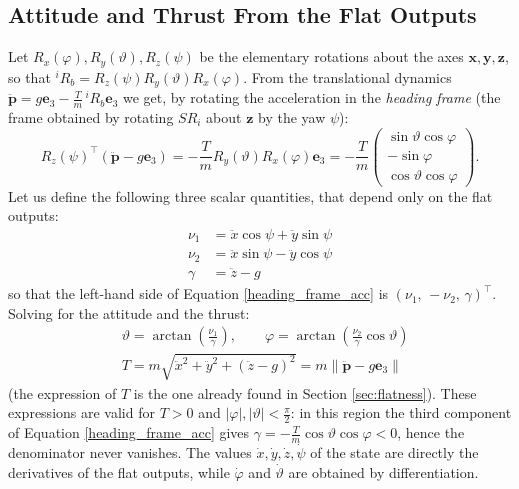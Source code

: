 \documentclass[10pt, a4paper]{report}
\begin{document}
\subsection{Attitude and Thrust From the Flat Outputs}
Let $R_x(\varphi),R_y(\vartheta),R_z(\psi)$ be the elementary rotations about the axes $\mathbf x,\mathbf y,\mathbf z$, so that ${}^iR_b=R_z(\psi)R_y(\vartheta)R_x(\varphi)$. From the translational dynamics $\ddot{\mathbf p}=g\mathbf e_3-\frac{T}{m}\,{}^iR_b\mathbf e_3$ we get, by rotating the acceleration in the \textit{heading frame} (the frame obtained by rotating $SR_i$ about $\mathbf z$ by the yaw $\psi$):\begin{equation}\label{heading_frame_acc}
    R_z(\psi)^\top\left(\ddot{\mathbf p}-g\mathbf e_3\right)=-\frac{T}{m}R_y(\vartheta)R_x(\varphi)\mathbf e_3=-\frac{T}{m}\begin{pmatrix}
        \sin\vartheta\cos\varphi\\-\sin\varphi\\\cos\vartheta\cos\varphi
    \end{pmatrix}.
\end{equation}
Let us define the following three scalar quantities, that depend only on the flat outputs:\begin{align}
    \nu_1&=\ddot x\cos\psi+\ddot y\sin\psi\\
    \nu_2&=\ddot x\sin\psi-\ddot y\cos\psi\\
    \gamma&=\ddot z-g
\end{align}
so that the left-hand side of Equation \eqref{heading_frame_acc} is $(\nu_1,\,-\nu_2,\,\gamma)^\top$. Solving for the attitude and the thrust:\begin{align}
    &\vartheta=\arctan\left(\frac{\nu_1}{\gamma}\right),\quad\quad\varphi=\arctan\left(\frac{\nu_2}{\gamma}\cos\vartheta\right)\label{angles_from_flat}\\
    &T=m\sqrt{\ddot x^2+\ddot y^2+(\ddot z-g)^2}=m\|\ddot{\mathbf p}-g\mathbf e_3\|
\end{align}
(the expression of $T$ is the one already found in Section \ref{sec:flatness}). These expressions are valid for $T>0$ and $|\varphi|,|\vartheta|<\frac{\pi}{2}$: in this region the third component of Equation \eqref{heading_frame_acc} gives $\gamma=-\frac{T}{m}\cos\vartheta\cos\varphi<0$, hence the denominator never vanishes. The values $\dot x,\dot y,\dot z,\dot\psi$ of the state are directly the derivatives of the flat outputs, while $\dot\varphi$ and $\dot\vartheta$ are obtained by differentiation.
\end{document}
